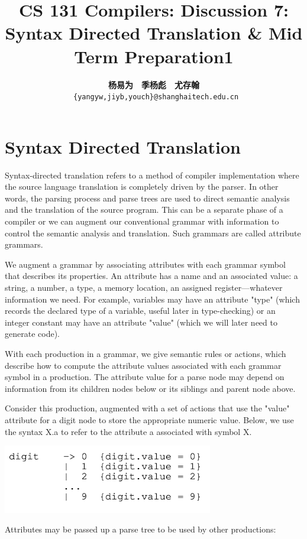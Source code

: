 \documentclass[a4paper]{article}
\title{CS 131 Compilers: Discussion 7: Syntax Directed Translation \& Mid Term Preparation1}
\author{\textbf{杨易为}~~\textbf{季杨彪}~~\textbf{尤存翰} \\ \texttt{ \{yangyw,jiyb,youch\}@shanghaitech.edu.cn}}
\theoremstyle{definition}
\begin{document}
\maketitle
\section{Syntax Directed Translation}
Syntax-directed translation refers to a method of compiler implementation where the source language translation is completely driven by the parser. In other words, the parsing process and parse trees are used to direct semantic analysis and the translation of the source program. This can be a separate phase of a compiler or we can augment our conventional grammar with information to control the semantic analysis and translation. Such grammars are called attribute grammars.

We augment a grammar by associating attributes with each grammar symbol that describes its properties. An attribute has a name and an associated value: a string, a number, a type, a memory location, an assigned register—whatever information we need. For example, variables may have an attribute "type" (which records the declared type of a variable, useful later in type-checking) or an integer constant may have an attribute "value" (which we will later need to generate code).

With each production in a grammar, we give semantic rules or actions, which describe how to compute the attribute values associated with each grammar symbol in a production. The attribute value for a parse node may depend on information from its children nodes below or its siblings and parent node above.

Consider this production, augmented with a set of actions that use the "value" attribute for a digit node to store the appropriate numeric value. Below, we use the syntax X.a to refer to the attribute a associated with symbol X.

\begin{center}
  \includegraphics[height=3cm]{img/Snipaste_2021-04-12_17-41-51.png}
  \end{center}
  Attributes may be passed up a parse tree to be used by other productions:
  
\end{document}
